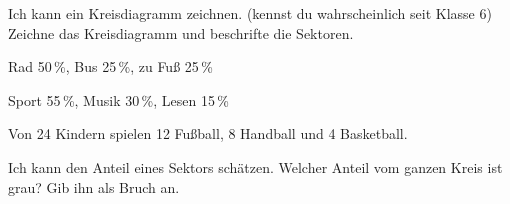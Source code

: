 \begin{aufgabe}{Ich kann ein Kreisdiagramm zeichnen. (kennst du wahrscheinlich seit Klasse 6)}
Zeichne das Kreisdiagramm und beschrifte die Sektoren.

\noindent\begin{minipage}[t]{0.32\linewidth}
\begin{teile}\teil Rad 50\,\%, Bus 25\,\%, zu Fuß 25\,\%\end{teile}
\kreisleer[1.8]
\end{minipage}\hfill
\begin{minipage}[t]{0.32\linewidth}
\begin{teile}\teil Sport 55\,\%, Musik 30\,\%, Lesen 15\,\%\end{teile}
\kreisleer[1.8]
\end{minipage}\hfill
\begin{minipage}[t]{0.32\linewidth}
\begin{teile}\teil Von 24 Kindern spielen 12 Fußball, 8 Handball und 4 Basketball.\end{teile}
\kreisleer[1.8]
\end{minipage}
\end{aufgabe}

\begin{aufgabe}{Ich kann den Anteil eines Sektors schätzen.}
Welcher Anteil vom ganzen Kreis ist grau? Gib ihn als Bruch an.

\noindent\begin{minipage}[t]{0.32\linewidth}
\begin{teile}\teil \leerfeld\end{teile}
\end{minipage}\hfill
\begin{minipage}[t]{0.32\linewidth}
\begin{teile}\teil \leerfeld\end{teile}
\end{minipage}\hfill
\begin{minipage}[t]{0.32\linewidth}
\begin{teile}\teil \leerfeld\end{teile}
\end{minipage}

\noindent\begin{minipage}[t]{0.32\linewidth}
\begin{teile}\teil \leerfeld\end{teile}
\end{minipage}\hfill
\begin{minipage}[t]{0.64\linewidth}
\begin{teile}\teil \leerfeld[\%]\end{teile}
\end{minipage}
\end{aufgabe}

